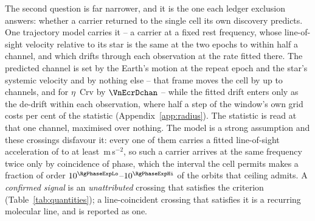 The second question is far narrower, and it is the one each ledger exclusion
answers: whether a carrier returned to the single cell its own discovery
predicts. One trajectory model carries it -- a carrier at a fixed rest
frequency, whose line-of-sight velocity relative to its star is the same at
the two epochs to within half a channel, and which drifts through each
observation at the rate fitted there. The predicted channel is set by the
Earth's motion at the repeat epoch and the star's systemic velocity and by
nothing else -- that frame moves the cell by up to \ZtFrameChanMax{} channels,
and for $\eta$~Crv by $\VnEcrDchan$ -- while the fitted drift enters only as
the de-drift within each observation, where half a step of the window's own
grid costs \RjDriftPct{} per cent of the statistic
(Appendix~\ref{app:radius}). The statistic is read at that one channel,
maximised over nothing. The model is a strong assumption and these crossings
disfavour it: every one of them carries a fitted line-of-sight acceleration of
\ZtALosLo{} to at least \ZtALosHi\,m\,s$^{-2}$, so such a carrier arrives at the same
frequency twice only by coincidence of phase, which the interval the cell
permits makes a fraction of order $10^{\RgPhaseExpLo}$--$10^{\RgPhaseExpHi}$
of the orbits that ceiling admits. A
\emph{confirmed signal} is an \emph{unattributed} crossing that satisfies the
criterion (Table~\ref{tab:quantities}); a line-coincident crossing that
satisfies it is a recurring molecular line, and is reported as one.

